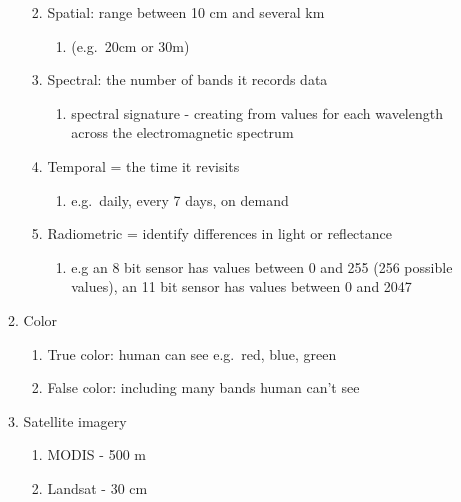 \documentclass[
  letterpaper,
  DIV=11,
  numbers=noendperiod]{scrreprt}
\providecommand{\tightlist}{%
  \setlength{\itemsep}{0pt}\setlength{\parskip}{0pt}}\usepackage{longtable,booktabs,array}
\begin{document}
\begin{enumerate}
\begin{enumerate}
    \begin{enumerate}
    \def\labelenumiii{\arabic{enumiii}.}
    \item
      Spatial: range between 10 cm and several km

      \begin{enumerate}
      \def\labelenumiv{\arabic{enumiv}.}
      \tightlist
      \item
        (e.g.~20cm or 30m)
      \end{enumerate}
    \item
      Spectral: the number of bands it records data

      \begin{enumerate}
      \def\labelenumiv{\arabic{enumiv}.}
      \tightlist
      \item
        spectral signature - creating from values for each wavelength
        across the electromagnetic spectrum
      \end{enumerate}
    \item
      Temporal = the time it revisits

      \begin{enumerate}
      \def\labelenumiv{\arabic{enumiv}.}
      \tightlist
      \item
        e.g.~daily, every 7 days, on demand
      \end{enumerate}
    \item
      Radiometric = identify differences in light or reflectance

      \begin{enumerate}
      \def\labelenumiv{\arabic{enumiv}.}
      \tightlist
      \item
        e.g an 8 bit sensor has values between 0 and 255 (256 possible
        values), an 11 bit sensor has values between 0 and 2047
      \end{enumerate}
    \end{enumerate}
  \item
    Color

    \begin{enumerate}
    \def\labelenumiii{\arabic{enumiii}.}
    \item
      True color: human can see e.g.~red, blue, green
    \item
      False color: including many bands human can't see
    \end{enumerate}
  \item
    Satellite imagery

    \begin{enumerate}
    \def\labelenumiii{\arabic{enumiii}.}
    \item
      MODIS - 500 m
    \item
      Landsat - 30 cm
    \end{enumerate}
  \end{enumerate}
\end{enumerate}
\end{document}
